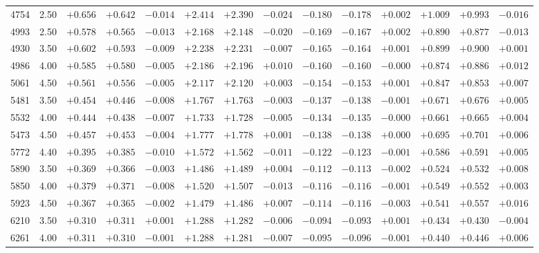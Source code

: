 \documentclass[]{aa}
\begin{document}
\begin{appendix}
\begin{table*}
\begin{center}
\begin{tabular}{llllllllllllll}
4754  &2.50&  $+0.656$ &$ +0.642$ &$ -0.014$ &$ +2.414$ &$ +2.390$ &$ -0.024$ &$ -0.180$ &$ -0.178$ &$ +0.002$ &$ +1.009$ &$ +0.993$  &$-0.016$\\
4993  &2.50&  $+0.578$ &$ +0.565$ &$ -0.013$ &$ +2.168$ &$ +2.148$ &$ -0.020$ &$ -0.169$ &$ -0.167$ &$ +0.002$ &$ +0.890$ &$ +0.877$  &$-0.013$\\
4930  &3.50&  $+0.602$ &$ +0.593$ &$ -0.009$ &$ +2.238$ &$ +2.231$ &$ -0.007$ &$ -0.165$ &$ -0.164$ &$ +0.001$ &$ +0.899$ &$ +0.900$  &$+0.001$\\
4986  &4.00&  $+0.585$ &$ +0.580$ &$ -0.005$ &$ +2.186$ &$ +2.196$ &$ +0.010$ &$ -0.160$ &$ -0.160$ &$ -0.000$ &$ +0.874$ &$ +0.886$  &$+0.012$\\
5061  &4.50&  $+0.561$ &$ +0.556$ &$ -0.005$ &$ +2.117$ &$ +2.120$ &$ +0.003$ &$ -0.154$ &$ -0.153$ &$ +0.001$ &$ +0.847$ &$ +0.853$  &$+0.007$\\
5481  &3.50&  $+0.454$ &$ +0.446$ &$ -0.008$ &$ +1.767$ &$ +1.763$ &$ -0.003$ &$ -0.137$ &$ -0.138$ &$ -0.001$ &$ +0.671$ &$ +0.676$  &$+0.005$\\
5532  &4.00&  $+0.444$ &$ +0.438$ &$ -0.007$ &$ +1.733$ &$ +1.728$ &$ -0.005$ &$ -0.134$ &$ -0.135$ &$ -0.000$ &$ +0.661$ &$ +0.665$  &$+0.004$\\
5473  &4.50&  $+0.457$ &$ +0.453$ &$ -0.004$ &$ +1.777$ &$ +1.778$ &$ +0.001$ &$ -0.138$ &$ -0.138$ &$ +0.000$ &$ +0.695$ &$ +0.701$  &$+0.006$\\
5772  &4.40&  $+0.395$ &$ +0.385$ &$ -0.010$ &$ +1.572$ &$ +1.562$ &$ -0.011$ &$ -0.122$ &$ -0.123$ &$ -0.001$ &$ +0.586$ &$ +0.591$  &$+0.005$\\
5890  &3.50&  $+0.369$ &$ +0.366$ &$ -0.003$ &$ +1.486$ &$ +1.489$ &$ +0.004$ &$ -0.112$ &$ -0.113$ &$ -0.002$ &$ +0.524$ &$ +0.532$  &$+0.008$\\
5850  &4.00&  $+0.379$ &$ +0.371$ &$ -0.008$ &$ +1.520$ &$ +1.507$ &$ -0.013$ &$ -0.116$ &$ -0.116$ &$ -0.001$ &$ +0.549$ &$ +0.552$  &$+0.003$\\
5923  &4.50&  $+0.367$ &$ +0.365$ &$ -0.002$ &$ +1.479$ &$ +1.486$ &$ +0.007$ &$ -0.114$ &$ -0.116$ &$ -0.003$ &$ +0.541$ &$ +0.557$  &$+0.016$\\
6210  &3.50&  $+0.310$ &$ +0.311$ &$ +0.001$ &$ +1.288$ &$ +1.282$ &$ -0.006$ &$ -0.094$ &$ -0.093$ &$ +0.001$ &$ +0.434$ &$ +0.430$  &$-0.004$\\
6261  &4.00&  $+0.311$ &$ +0.310$ &$ -0.001$ &$ +1.288$ &$ +1.281$ &$ -0.007$ &$ -0.095$ &$ -0.096$ &$ -0.001$ &$ +0.440$ &$ +0.446$  &$+0.006$\\

\end{tabular}
\end{center}
\end{table*}
\end{appendix}
\end{document}
